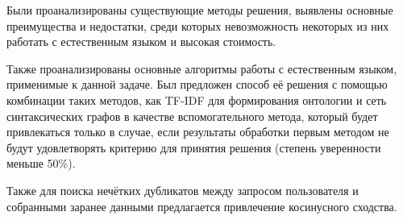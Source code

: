 Были проанализированы существующие методы решения, выявлены основные преимущества и недостатки, среди которых невозможность некоторых из них работать с естественным языком и высокая стоимость. 

Также проанализированы основные алгоритмы работы с естественным языком, применимые к данной задаче. Был предложен способ её решения с помощью комбинации таких методов, как TF-IDF для формирования онтологии и сеть синтаксических графов в качестве вспомогательного метода, который будет привлекаться только в случае, если результаты обработки первым методом не будут удовлетворять критерию для принятия решения (степень уверенности меньше 50\%).

Также для поиска нечётких дубликатов между запросом пользователя и собранными заранее данными предлагается привлечение косинусного сходства.
\pagebreak
